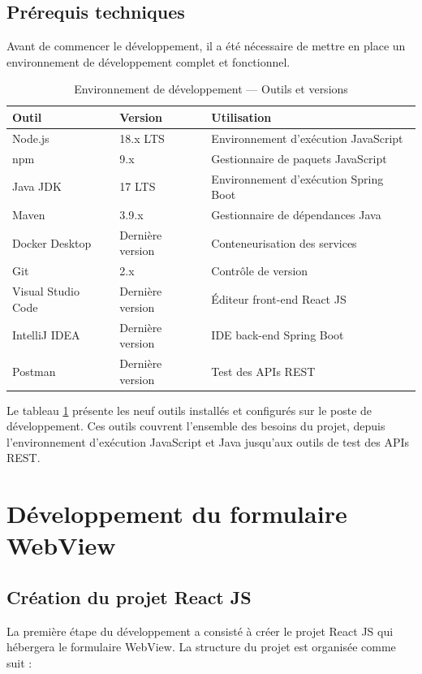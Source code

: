 \subsection{Prérequis techniques}
Avant de commencer le développement, il a été nécessaire de mettre en 
place un environnement de développement complet et fonctionnel.

\begin{table}[H]
\centering
\caption{Environnement de développement — Outils et versions}
\label{tab:env_dev}
\renewcommand{\arraystretch}{1.5}
\begin{tabular}{|p{4cm}|p{3cm}|p{6cm}|}
\hline
\textbf{Outil} & \textbf{Version} & \textbf{Utilisation} \\
\hline
Node.js & 18.x LTS & Environnement d'exécution JavaScript \\
\hline
npm & 9.x & Gestionnaire de paquets JavaScript \\
\hline
Java JDK & 17 LTS & Environnement d'exécution Spring Boot \\
\hline
Maven & 3.9.x & Gestionnaire de dépendances Java \\
\hline
Docker Desktop & Dernière version & Conteneurisation des services \\
\hline
Git & 2.x & Contrôle de version \\
\hline
Visual Studio Code & Dernière version & Éditeur front-end React JS \\
\hline
IntelliJ IDEA & Dernière version & IDE back-end Spring Boot \\
\hline
Postman & Dernière version & Test des APIs REST \\
\hline
\end{tabular}
\end{table}

Le tableau \ref{tab:env_dev} présente les neuf outils installés et 
configurés sur le poste de développement. Ces outils couvrent l'ensemble 
des besoins du projet, depuis l'environnement d'exécution JavaScript 
et Java jusqu'aux outils de test des APIs REST.

\section{Développement du formulaire WebView}

\subsection{Création du projet React JS}
La première étape du développement a consisté à créer le projet React JS 
qui hébergera le formulaire WebView. La structure du projet est organisée 
comme suit :

